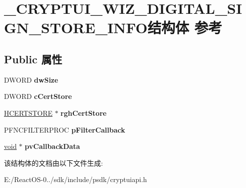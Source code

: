 \hypertarget{struct___c_r_y_p_t_u_i___w_i_z___d_i_g_i_t_a_l___s_i_g_n___s_t_o_r_e___i_n_f_o}{}\section{\+\_\+\+C\+R\+Y\+P\+T\+U\+I\+\_\+\+W\+I\+Z\+\_\+\+D\+I\+G\+I\+T\+A\+L\+\_\+\+S\+I\+G\+N\+\_\+\+S\+T\+O\+R\+E\+\_\+\+I\+N\+F\+O结构体 参考}
\label{struct___c_r_y_p_t_u_i___w_i_z___d_i_g_i_t_a_l___s_i_g_n___s_t_o_r_e___i_n_f_o}
\subsection*{Public 属性}
\begin{DoxyCompactItemize}
\item 
\mbox{\label{struct___c_r_y_p_t_u_i___w_i_z___d_i_g_i_t_a_l___s_i_g_n___s_t_o_r_e___i_n_f_o_a476ec2d6466bfaa95c0fd5fee34d5bdc}} 
D\+W\+O\+RD {\bfseries dw\+Size}
\item 
\mbox{\label{struct___c_r_y_p_t_u_i___w_i_z___d_i_g_i_t_a_l___s_i_g_n___s_t_o_r_e___i_n_f_o_a797e97fa000d6bacaabe77d797ec2581}} 
D\+W\+O\+RD {\bfseries c\+Cert\+Store}
\item 
\mbox{\label{struct___c_r_y_p_t_u_i___w_i_z___d_i_g_i_t_a_l___s_i_g_n___s_t_o_r_e___i_n_f_o_a1fcdff46d1340b8b96fc69d2e17f9908}} 
\hyperlink{interfacevoid}{H\+C\+E\+R\+T\+S\+T\+O\+RE} $\ast$ {\bfseries rgh\+Cert\+Store}
\item 
\mbox{\label{struct___c_r_y_p_t_u_i___w_i_z___d_i_g_i_t_a_l___s_i_g_n___s_t_o_r_e___i_n_f_o_aa9419745b5c74ff3502742954af0cc13}} 
P\+F\+N\+C\+F\+I\+L\+T\+E\+R\+P\+R\+OC {\bfseries p\+Filter\+Callback}
\item 
\mbox{\label{struct___c_r_y_p_t_u_i___w_i_z___d_i_g_i_t_a_l___s_i_g_n___s_t_o_r_e___i_n_f_o_a0d715c375be427318bd2055fca5f4efa}} 
\hyperlink{interfacevoid}{void} $\ast$ {\bfseries pv\+Callback\+Data}
\end{DoxyCompactItemize}


该结构体的文档由以下文件生成\+:\begin{DoxyCompactItemize}
\item 
E\+:/\+React\+O\+S-\/0../sdk/include/psdk/cryptuiapi.\+h\end{DoxyCompactItemize}
